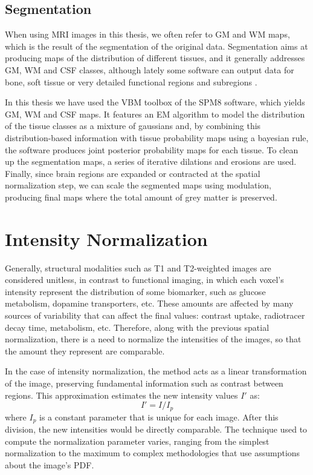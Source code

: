 \subsection{Segmentation}
When using \ac{MRI} images in this thesis, we often refer to \acf{GM} and \acf{WM} maps, which is the result of the segmentation of the original data. Segmentation aims at producing maps of the distribution of different tissues, and it generally addresses \ac{GM}, \ac{WM} and \ac{CSF} classes, although lately some software can output data for bone, soft tissue or very detailed functional regions and subregions \cite{Fischl2002}. 

In this thesis we have used the \ac{VBM} toolbox of the \ac{SPM8} software, which yields \ac{GM}, \ac{WM} and \ac{CSF} maps. It features an \ac{EM} algorithm to model the distribution of the tissue classes as a mixture of gaussians and, by combining this distribution-based information with tissue probability maps using a bayesian rule, the software produces joint posterior probability maps for each tissue. To clean up the segmentation maps, a series of iterative dilations and erosions are used. Finally, since brain regions are expanded or contracted at the spatial normalization step, we can scale the segmented maps using modulation, producing final maps where the total amount of grey matter is preserved. 

\section{Intensity Normalization}
Generally, structural modalities such as T1 and T2-weighted images are considered unitless, in contrast to functional imaging, in which each voxel's intensity represent the distribution of some biomarker, such as glucose metabolism, dopamine transporters, etc. These amounts are affected by many sources of variability that can affect the final values: contrast uptake, radiotracer decay time, metabolism, etc. Therefore, along with the previous spatial normalization, there is a need to normalize the intensities of the images, so that the amount they represent are comparable. 

In the case of intensity normalization, the method acts as a linear transformation of the image, preserving fundamental information such as contrast between regions. This approximation estimates the new intensity values $I'$ as: 
\begin{equation}
	I' = I/I_p 
\end{equation}
where $I_p$ is a constant parameter that is unique for each image. After this division, the new intensities would be directly comparable. The technique used to compute the normalization parameter varies, ranging from the simplest normalization to the maximum \cite{Salas-Gonzalez2009,Martinez-Murcia20129676} to complex methodologies that use assumptions about the image's \ac{PDF}. 

